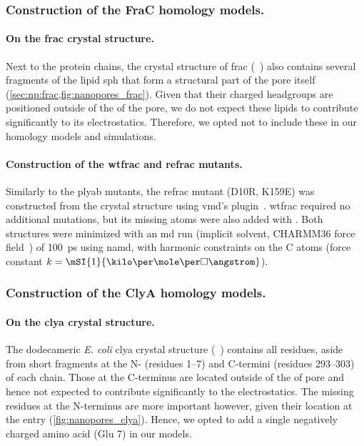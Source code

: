 \subsubsection{Construction of the FraC homology models.}
%

\paragraph{On the \gls{frac} crystal structure.}
%
Next to the protein chains, the crystal structure of \gls{frac} (~\cite{Tanaka-2015}) also
contains several fragments of the lipid \gls{sph} that form a structural part of the pore itself
(\cref{sec:np:frac,fig:nanopores_frac}). Given that their charged headgroups are positioned outside of the
\lumen{} of the pore, we do not expect these lipids to contribute significantly to its electrostatics.
Therefore, we opted not to include these in our homology models and simulations.

\paragraph{Construction of the \gls{wtfrac} and \gls{refrac} mutants.}
%
Similarly to the \gls{plyab} mutants, the \gls{refrac} mutant (D10R, K159E) was constructed from the crystal
structure using \gls{vmd}'s  plugin~\cite{Humphrey-1996}. \Gls{wtfrac} required no additional
mutations, but its missing atoms were also added with . Both structures were minimized with an
\gls{md} run (implicit solvent, CHARMM36 force field~\cite{Best-2012}) of \SI{100}{\ps} using \gls{namd}, with
harmonic constraints on the C\ta{} atoms (force constant $k=\mSI{1}{\kilo\cal\per\mole\per\square\angstrom}$).


\subsubsection{Construction of the ClyA homology models.}
%

\paragraph{On the \gls{clya} crystal structure.}
%
The dodecameric \textit{E. coli} \gls{clya} crystal structure (~\cite{Mueller-2009}) contains all
residues, aside from short fragments at the N- (residues \numrange{1}{7}) and C-termini (residues
\numrange{293}{303}) of each chain. Those at the C-terminus are located outside of the \lumen{} of pore and
hence not expected to contribute significantly to the electrostatics. The missing residues at the N-terminus
are more important however, given their location at the \transi{} entry (\cref{fig:nanopores_clya}). Hence, we
opted to add a single negatively charged amino acid (Glu 7) in our models.

